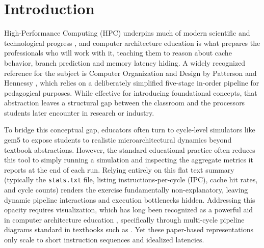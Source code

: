 \documentclass[runningheads,a4paper]{llncs}
\begin{document}
\section{Introduction}

High-Performance Computing (HPC) underpins much of modern scientific and technological progress \cite{dongarra2011international}, and computer architecture education is what prepares the professionals who will work with it, teaching them to reason about cache behavior, branch prediction and memory latency hiding. A widely recognized reference for the subject is Computer Organization and Design by Patterson and Hennessy \cite{patterson2020computer}, which relies on a deliberately simplified five-stage in-order pipeline for pedagogical purposes. While effective for introducing foundational concepts, that abstraction leaves a structural gap between the classroom and the processors students later encounter in research or industry.

To bridge this conceptual gap, educators often turn to cycle-level simulators like gem5 \cite{binkert2011gem5} to expose students to realistic microarchitectural dynamics beyond textbook abstractions. However, the standard educational practice often reduces this tool to simply running a simulation and inspecting the aggregate metrics it reports at the end of each run. Relying entirely on this flat text summary (typically the \texttt{stats.txt} file, listing instructions-per-cycle (IPC), cache hit rates, and cycle counts) renders the exercise fundamentally non-explanatory, leaving dynamic pipeline interactions and execution bottlenecks hidden. Addressing this opacity requires visualization, which has long been recognized as a powerful aid in computer architecture education \cite{yehezkel2007contribution,yeh2023visualization}, specifically through multi-cycle pipeline diagrams standard in textbooks such as \cite{patterson2020computer}. Yet these paper-based representations only scale to short instruction sequences and idealized latencies. 
\end{document}
